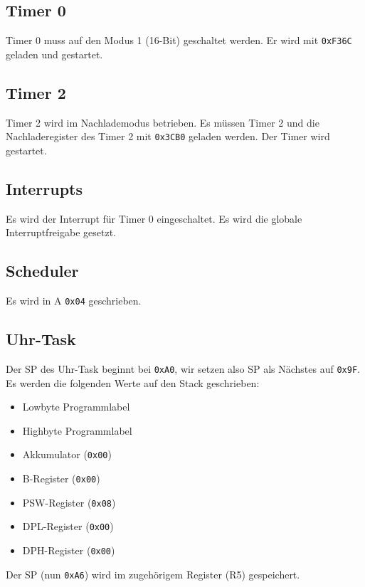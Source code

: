 \subsection{Timer 0}
Timer 0 muss auf den Modus 1 (16-Bit) geschaltet werden.
Er wird mit \verb|0xF36C| geladen und gestartet.

\subsection{Timer 2}
Timer 2 wird im Nachlademodus betrieben.
Es müssen Timer 2 und die Nachladeregister des Timer 2 mit \verb|0x3CB0| geladen werden.
Der Timer wird gestartet.

\subsection{Interrupts}
Es wird der Interrupt für Timer 0 eingeschaltet.
Es wird die globale Interruptfreigabe gesetzt.

\subsection{Scheduler}
Es wird in A \verb|0x04| geschrieben.

\subsection{Uhr-Task}
Der SP des Uhr-Task beginnt bei \verb|0xA0|, wir setzen also SP als Nächstes auf \verb|0x9F|.
Es werden die folgenden Werte auf den Stack geschrieben:
\begin{itemize}
    \item Lowbyte Programmlabel
    \item Highbyte Programmlabel
    \item Akkumulator (\verb|0x00|)
    \item B-Register (\verb|0x00|)
    \item PSW-Register (\verb|0x08|)
    \item DPL-Register (\verb|0x00|)
    \item DPH-Register (\verb|0x00|)
\end{itemize}
Der SP (nun \verb|0xA6|) wird im zugehörigem Register (R5) gespeichert.

